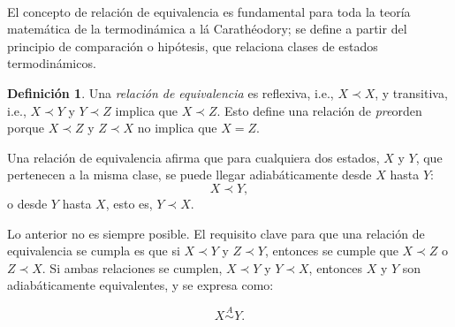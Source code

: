 \documentclass{article}
\theoremstyle{definition} \newtheorem{defi}{Definici\'on}
\theoremstyle{definition} \newtheorem{teo}{Teorema}
\theoremstyle{definition} \newtheorem{cor}{Corolario}
\begin{document}
\paragraph{}
El concepto de relaci\'on de equivalencia es fundamental para toda la teor\'ia matem\'atica de la termodin\'amica a l\'a Carath\'eodory; se define a partir del principio de comparaci\'on o hip\'otesis, que relaciona clases de estados termodin\'amicos.

\begin{defi}
Una \emph{relaci\'on de equivalencia} es reflexiva, i.e., $X \prec X$, y transitiva, i.e., $X \prec Y$ y $Y \prec Z$ implica que $X \prec Z$. Esto define una relaci\'on de \emph{pre}orden porque $X\prec Z$ y $Z\prec X$ no implica que $X = Z$.
\end{defi}
Una relaci\'on de equivalencia afirma que para cualquiera dos estados, $X$ y $Y$, que pertenecen a la misma clase, se puede llegar adiab\'aticamente desde $X$ hasta $Y$:
\begin{equation*}
X \prec Y,
\end{equation*}
o desde $Y$ hasta $X$, esto es, $Y\prec X$.

Lo anterior no es siempre posible. El requisito clave para que una relaci\'on de equivalencia se cumpla es que si $X\prec Y$ y $Z\prec Y$, entonces se cumple que $X\prec Z$ o $Z\prec X$.
Si ambas relaciones se cumplen, $X\prec Y$ y $Y\prec X$, entonces $X$ y $Y$ son adiab\'aticamente equivalentes, y se expresa como\cite{mt}:

\begin{equation*}
X \stackrel{A}{\sim} Y.
\end{equation*}
\end{document}
